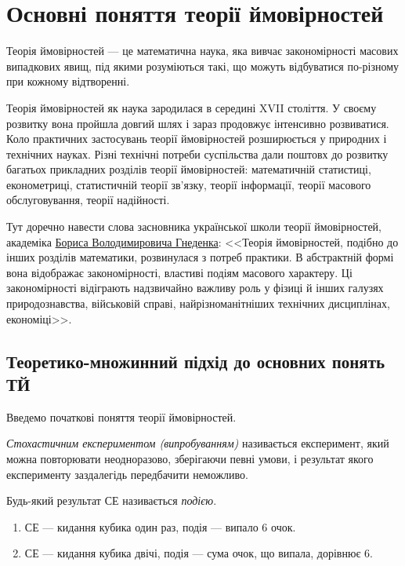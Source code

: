 
\section{Основні поняття теорії ймовірностей}
Теорія ймовірностей --- це математична наука, яка вивчає закономірності масових випадкових явищ, під якими розуміються такі,
що можуть відбуватися по-різному при кожному відтворенні.

Теорія ймовірностей як наука зародилася в середині XVII століття. У своєму розвитку вона пройшла довгий шлях
і зараз продовжує інтенсивно розвиватися. Коло практичних застосувань теорії ймовірностей розширюється у природних і технічних науках.
Різні технічні потреби суспільства дали поштовх до розвитку багатьох прикладних розділів теорії ймовірностей: математичній статистиці,
економетриці, статистичній теорії зв'язку,
теорії інформації, теорії масового обслуговування, теорії надійності.

Тут доречно навести слова засновника української школи теорії ймовірностей,
академіка 
\href{https://uk.wikipedia.org/wiki/%D0%93%D0%BD%D1%94%D0%B4%D0%B5%D0%BD%D0%BA%D0%BE_%D0%91%D0%BE%D1%80%D0%B8%D1%81_%D0%92%D0%BE%D0%BB%D0%BE%D0%B4%D0%B8%D0%BC%D0%B8%D1%80%D0%BE%D0%B2%D0%B8%D1%87}{Бориса Володимировича Гнеденка}: 
<<Теорія ймовірностей, подібно до інших розділів математики, розвинулася з потреб практики.
В абстрактній формі вона відображає закономірності, властиві подіям масового характеру. Ці закономірності відіграють надзвичайно важливу
роль у фізиці й інших галузях природознавства, військовій справі, найрізноманітніших технічних дисциплінах, економіці>>.

\subsection{Теоретико-множинний підхід до основних понять ТЙ}
Введемо початкові поняття теорії ймовірностей.
\begin{definition}
    \emph{Стохастичним експериментом (випробуванням)} називається експеримент, 
    який можна повторювати неодноразово, зберігаючи певні умови, і результат якого 
    експерименту заздалегідь передбачити неможливо.
\end{definition}
\begin{definition}
    Будь-який результат СЕ називається \emph{подією}.
\end{definition}
\begin{example}
    \begin{enumerate}
        \item СЕ --- кидання кубика один раз, подія --- випало 6 очок.
        \item СЕ --- кидання кубика двічі, подія --- сума очок, що випала, дорівнює 6.
    \end{enumerate}
\end{example}

